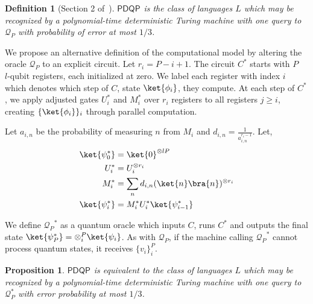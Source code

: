 \documentclass[10pt,a4paper]{article}
\newcommand{\abilityamount}[0]{\ensuremath{P}\xspace} %
\newcommand{\pdqporacle}[0]{\ensuremath{\mathcal{Q}_P}\xspace}
\newcommand{\quantumstate}[1]{\ensuremath{\ket{\phi_{#1}}}\xspace}
\newcommand{\parallelregisters}[0]{\ensuremath{r_i}\xspace}
\newcommand{\compclass}[2][]{\ensuremath{\mathsf{#2}^{#1}}\xspace}
\newcommand{\pdqpname}[0]{\compclass{PDQP}}
\newtheorem{definition}[theorem]{Definition}
\newtheorem{proposition}[theorem]{Proposition}
\begin{document}
\begin{definition}[Section 2 of~\cite{space_above_bqp}]\label{definition_pdqp_original}
    \pdqpname is the class of languages $L$ which may be recognized by a polynomial-time deterministic Turing machine with one query to \pdqporacle with probability of error at most $1/3$.
\end{definition}

We propose an alternative definition of the computational model by altering the oracle \pdqporacle to an explicit circuit. Let $\parallelregisters=\abilityamount-i+1$. The circuit $C^*$ starts with \abilityamount $l\text{-qubit}$ registers, each initialized at zero. We label each register with index $i$ which denotes which step of $C$, state $\quantumstate{i}$, they compute. At each step of $C^*$, we apply adjusted gates $U^*_i$ and $M^*_i$ over \parallelregisters registers to all registers $j\geq i$, creating $\{\ket{\phi_i}\}_i$ through parallel computation.

Let $a_{i,n}$ be the probability of measuring $n$ from $M_i$ and $d_{i,n} = \frac{1}{a_{i,n}^{\parallelregisters-1}}$. Let,
\begin{align}
    \ket{\psi_0^*} &= \ket{0}^{\otimes l \abilityamount} \\
    U_i^* &= U_i^{\otimes \parallelregisters} \\
    M_i^* &= \sum_n d_{i,n} (\ket{n}\bra{n})^{\otimes \parallelregisters} \label{eq_our_definition_measurement}\\
    \ket{\psi_{i}^*} &= M_i^*U_i^*\ket{\psi_{i-1}^*}
\end{align}

We define $\pdqporacle^*$ as a quantum oracle which inputs $C$, runs $C^*$ and outputs the final state $\ket{\psi_{\abilityamount}^*} = \otimes_i^{\abilityamount} \ket{\psi_i}$. As with \pdqporacle, if the machine calling $\pdqporacle^*$ cannot process quantum states, it receives $\{v_i\}_i^{\abilityamount}$.

\begin{proposition}\label{proposition_equivalent_models}
    \pdqpname is equivalent to the class of languages $L$ which may be recognized by a polynomial-time deterministic Turing machine with one query to $\mathcal{Q}_P^*$ with error probability at most $1/3$.
\end{proposition}
\end{document}
